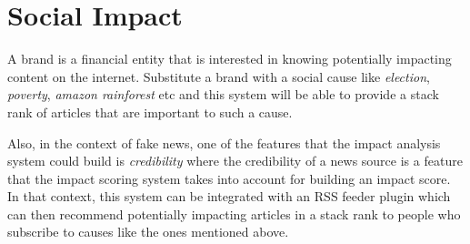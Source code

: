 \documentclass{article}
\begin{document}

\section*{Social Impact} %
A brand is a financial entity that is interested in knowing potentially impacting content on the internet. Substitute a brand with a social cause like \textit{election}, \textit{poverty}, \textit{amazon rainforest} etc and this system will be able to provide a stack rank of articles that are important to such a cause. 

Also, in the context of fake news, one of the features that the impact analysis system could build is \textit{credibility} where the credibility of a news source is a feature that the impact scoring system takes into account for building an impact score. In that context, this system can be integrated with an RSS feeder plugin which can then recommend potentially impacting articles in a stack rank to people who subscribe to causes like the ones mentioned above.
\end{document}
